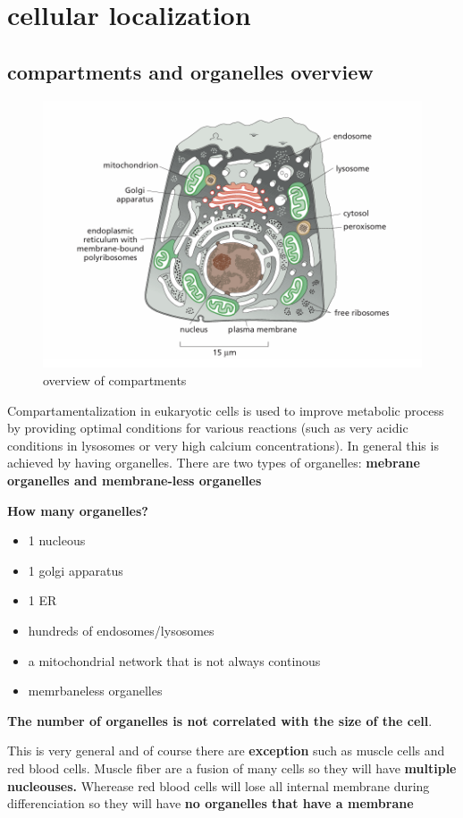 \documentclass[../main.tex]{subfiles}
\begin{document}
\section{cellular localization}

\subsection{compartments and organelles overview}
\begin{figure}[H]
    \centering
    \includegraphics[width=0.5\linewidth]{compartmentOverview.png}
    \caption{overview of compartments}
    \label{fig:enter-label}
\end{figure}
    Compartamentalization in eukaryotic cells is used to improve metabolic process by providing optimal conditions for various reactions (such as very acidic conditions in lysosomes or very high calcium concentrations). In general this is achieved by having organelles. There are two types of organelles: \textbf{mebrane organelles and membrane-less organelles}

    \textbf{How many organelles?}

    \begin{itemize}
        \item 1 nucleous
        \item 1 golgi apparatus
        \item 1 ER
        \item hundreds of endosomes/lysosomes
        \item a mitochondrial network that is not always continous 
        \item memrbaneless organelles 
        
    \end{itemize}

   \textbf{ The number of organelles is not correlated with the size of the cell}. 

   This is very general and of course there are \textbf{exception }such as muscle cells and red blood cells. Muscle fiber are a fusion of many cells so they will have\textbf{ multiple nucleouses. } Wherease red blood cells will lose all internal membrane during differenciation so they will have\textbf{ no organelles that have a membrane}
\end{document}
